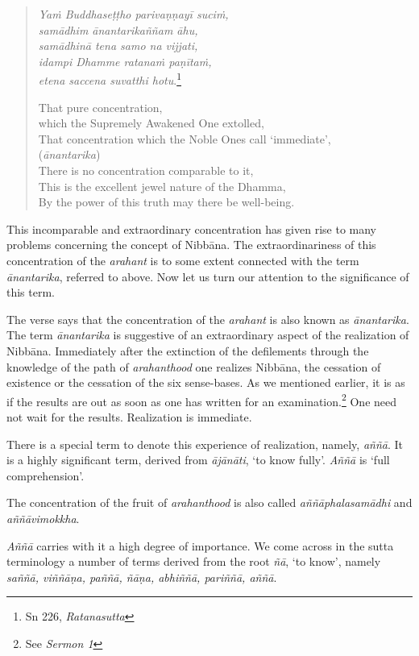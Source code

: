 \begin{quote}
\emph{Yaṁ Buddhaseṭṭho parivaṇṇayī suciṁ,}\\
\emph{samādhim ānantarikaññam āhu,}\\
\emph{samādhinā tena samo na vijjati,}\\
\emph{idampi Dhamme ratanaṁ paṇītaṁ,}\\
\emph{etena saccena suvatthi hotu}.\footnote{Sn 226, \emph{Ratanasutta}}

That pure concentration,\\
\vin which the Supremely Awakened One extolled,\\
That concentration which the Noble Ones call `immediate',\\
\vin (\emph{ānantarika})\\
There is no concentration comparable to it,\\
This is the excellent jewel nature of the Dhamma,\\
By the power of this truth may there be well-being.
\end{quote}

This incomparable and extraordinary concentration has given rise to many problems concerning the concept of Nibbāna. The extraordinariness of this concentration of the \emph{arahant} is to some extent connected with the term \emph{ānantarika}, referred to above. Now let us turn our attention to the significance of this term.

The verse says that the concentration of the \emph{arahant} is also known as \emph{ānantarika}. The term \emph{ānantarika} is suggestive of an extraordinary aspect of the realization of Nibbāna. Immediately after the extinction of the defilements through the knowledge of the path of \emph{arahanthood} one realizes Nibbāna, the cessation of existence or the cessation of the six sense-bases. As we mentioned earlier, it is as if the results are out as soon as one has written for an examination.\footnote{See \emph{Sermon 1}} One need not wait for the results. Realization is immediate.

There is a special term to denote this experience of realization, namely, \emph{aññā}. It is a highly significant term, derived from \emph{ājānāti}, `to know fully'. \emph{Aññā} is `full comprehension'.

The concentration of the fruit of \emph{arahanthood} is also called \emph{aññāphalasamādhi} and \emph{aññāvimokkha}.

\emph{Aññā} carries with it a high degree of importance. We come across in the sutta terminology a number of terms derived from the root \emph{ñā}, `to know', namely \emph{saññā, viññāṇa, paññā, ñāṇa, abhiññā, pariññā, aññā}.

